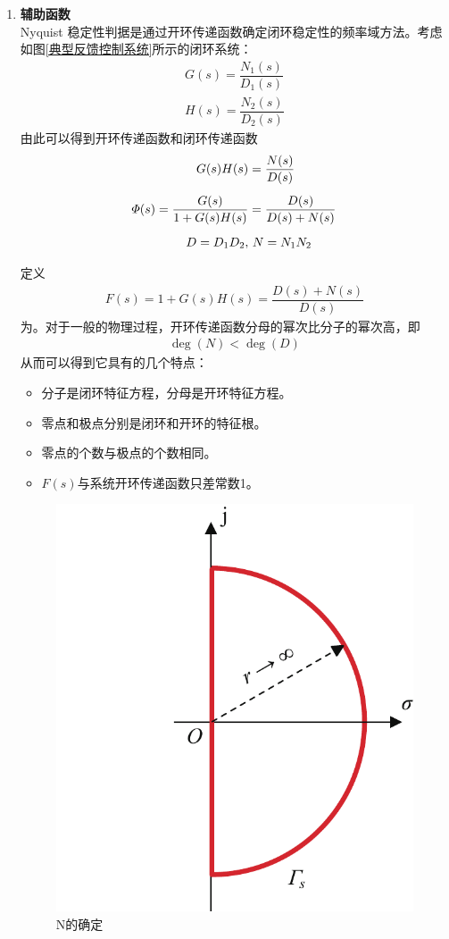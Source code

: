 \begin{enumerate}[1.]
	\item \textbf{辅助函数}\\
	\hspace*{2em}Nyquist 稳定性判据是通过开环传递函数确定闭环稳定性的频率域方法。考虑如图\ref{典型反馈控制系统}所示的闭环系统：
	\begin{align}
		G(s) = \dfrac{N_1(s)}{D_1(s)}\\[0.5em]
		H(s) = \dfrac{N_2(s)}{D_2(s)}
	\end{align}
	由此可以得到开环传递函数和闭环传递函数
	\begin{align}
		G(s)H(s) &= \dfrac{N(s)}{D(s)}\\[0.5em]
		\varPhi(s) = \dfrac{G(s)}{1 + G(s)H(s)} &= \dfrac{D(s)}{D(s) + N(s)}\\[0.5em]
		D= D_1D_2,& \,\,N = N_1N_2\notag
	\end{align}

	\hspace*{2em}定义
	\begin{align}
		F(s) = 1 + G(s)H(s) = \dfrac{D(s) + N(s)}{D(s)}
	\end{align}
	为。对于一般的物理过程，开环传递函数分母的幂次比分子的幂次高，即
	\begin{align*}
		\deg(N) < \deg(D)
	\end{align*}
	从而可以得到它具有的几个特点：
	\begin{itemize}
		\item 分子是闭环特征方程，分母是开环特征方程。
		\item 零点和极点分别是闭环和开环的特征根。
		\item 零点的个数与极点的个数相同。
		\item $F(s)$与系统开环传递函数只差常数1。
	\end{itemize}
	\vspace*{1em}

			
\begin{figure}[!htb]
	\centering
	\includegraphics[width=0.3\linewidth]{pic/转圈数.pdf}
	\caption{N的确定}
	\label{转圈数}
\end{figure}


\end{enumerate}
